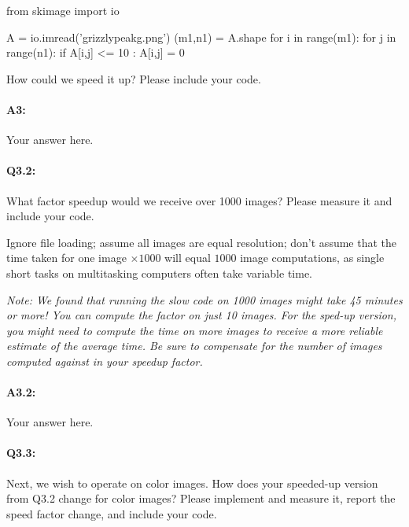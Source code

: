 \documentclass[11pt]{article}
\begin{document}
\begin{python}
from skimage import io

A = io.imread('grizzlypeakg.png')
(m1,n1) = A.shape
for i in range(m1):
    for j in range(n1):
        if A[i,j] <= 10 :
            A[i,j] = 0       
\end{python}

How could we speed it up? Please include your code. \\

\paragraph{A3:} Your answer here.




\pagebreak
\paragraph{Q3.2:} What factor speedup would we receive over 1000 images? Please measure it and include your code.

Ignore file loading; assume all images are equal resolution; don't assume that the time taken for one image $\times1000$ will equal $1000$ image computations, as single short tasks on multitasking computers often take variable time.

\emph{Note: We found that running the slow code on 1000 images might take 45 minutes or more! You can compute the factor on just 10 images. For the sped-up version, you might need to compute the time on more images to receive a more reliable estimate of the average time. Be sure to compensate for the number of images computed against in your speedup factor.}

\paragraph{A3.2:} Your answer here.




\pagebreak
\paragraph{Q3.3:} Next, we wish to operate on color images. How does your speeded-up version from Q3.2 change for color images? Please implement and measure it, report the speed factor change, and include your code.
\end{document}
